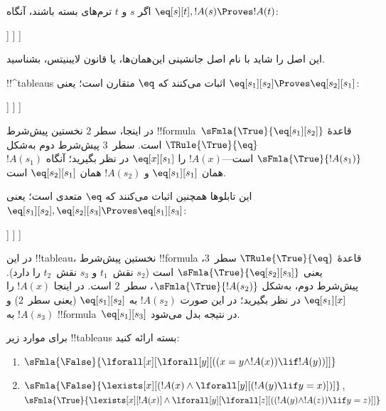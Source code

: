 \documentclass[../../../include/open-logic-section]{subfiles}
\begin{document}
\begin{ex}
اگر $s$ و $t$ ترم‌های بسته باشند، آنگاه
$\eq[s][t], !A(s) \Proves !A(t)$:
\begin{oltableau}
  [\sFmla{\False}{\formula{A}(t)}, just = \TAss
    [\sFmla{\True}{\eq[s][t]}, just = \TAss
      [\sFmla{\True}{\formula{A}(s)}, just = \TAss
        [\sFmla{\True}{\formula{A}(t)}, just={\TRule{\True}{\eq}[2, 3]}, close]
      ]
    ]
  ]
\end{oltableau}
این اصل را شاید با نام اصل جانشینی این‌همان‌ها، یا قانون لایبنیتس،
بشناسید.

!!^{tableau}s اثبات می‌کنند که $\eq$ متقارن است؛ یعنی
$\eq[s_1][s_2] \Proves \eq[s_2][s_1]$:
\begin{oltableau}
  [\sFmla{\False}{\eq[s_2][s_1]}, just = \TAss
    [\sFmla{\True}{\eq[s_1][s_2]}, just = \TAss
      [\sFmla{\True}{\eq[s_1][s_1]}, just = {$\eq$}
        [\sFmla{\True}{\eq[s_2][s_1]}, just = {\TRule{\True}{\eq}[2, 3]}, close]
      ]
    ]
  ]
\end{oltableau}
در اینجا، سطر $2$ نخستین پیش‌شرط
!!{formula}~$\sFmla{\True}{\eq[s_1][s_2]}$ قاعدهٔ
$\TRule{\True}{\eq}$ است. سطر~$3$ پیش‌شرط دوم
به‌شکل $\sFmla{\True}{!A(s_1)}$ است---$!A(x)$ را
$\eq[x][s_1]$ در نظر بگیرید؛ آنگاه $!A(s_1)$ همان
$\eq[s_1][s_1]$ و $!A(s_2)$ همان $\eq[s_2][s_1]$ است.

این تابلوها همچنین اثبات می‌کنند که $\eq$ متعدی است؛ یعنی
$\eq[s_1][s_2], \eq[s_2][s_3] \Proves \eq[s_1][s_3]$:
\begin{oltableau}
  [\sFmla{\False}{\eq[s_1][s_3]}, just = \TAss
    [\sFmla{\True}{\eq[s_1][s_2]}, just = \TAss
      [\sFmla{\True}{\eq[s_2][s_3]}, just = \TAss
        [\sFmla{\True}{\eq[s_1][s_3]}, just = {\TRule{\True}{\eq}[3, 2]}, close]
      ]
    ]
  ]
\end{oltableau}
در این !!{tableau}، نخستین پیش‌شرط !!{formula} قاعدهٔ
$\TRule{\True}{\eq}$ سطر~$3$، یعنی
$\sFmla{\True}{\eq[s_2][s_3]}$ است ($s_2$ نقش~$t_1$ و $s_3$
نقش~$t_2$ را دارد). پیش‌شرط دوم، به‌شکل
$\sFmla{\True}{!A(s_2)}$، سطر~$2$ است. در اینجا $!A(x)$ را
$\eq[s_1][x]$ در نظر بگیرید؛ در این صورت $!A(s_2)$ به
$\eq[s_1][s_2]$ (یعنی سطر~$2$) و $!A(s_3)$ به
!!{formula}~$\eq[s_1][s_3]$ در نتیجه بدل می‌شود.
\end{ex}

\begin{prob}
برای موارد زیر !!{tableau}s بسته ارائه کنید:
\begin{enumerate}
\item $\sFmla{\False}{\lforall[x][\lforall[y][((x = y \land !A(x))
      \lif !A(y))]]}$
\item $\sFmla{\False}{\lexists[x][(!A(x) \land
    \lforall[y][(!A(y) \lif y = x)])]}$,\\
  $\sFmla{\True}{\lexists[x][!A(x)] \land
    \lforall[y][\lforall[z][((!A(y) \land !A(z)) \lif y = z)]]}$
\end{enumerate}
\end{prob}
\end{document}
